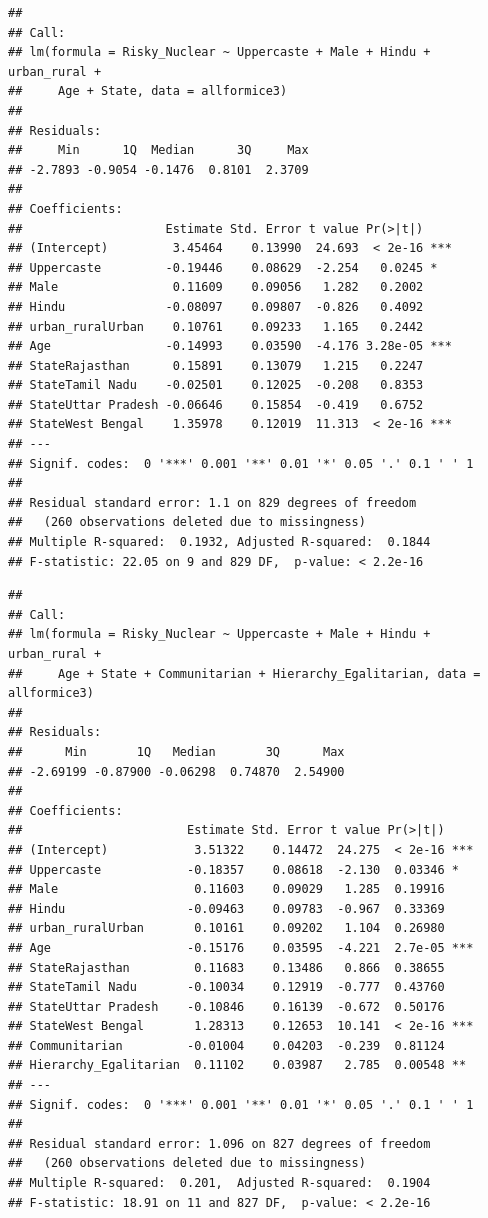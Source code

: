 \documentclass[
]{article}
\begin{document}
\begin{verbatim}
## 
## Call:
## lm(formula = Risky_Nuclear ~ Uppercaste + Male + Hindu + urban_rural + 
##     Age + State, data = allformice3)
## 
## Residuals:
##     Min      1Q  Median      3Q     Max 
## -2.7893 -0.9054 -0.1476  0.8101  2.3709 
## 
## Coefficients:
##                    Estimate Std. Error t value Pr(>|t|)    
## (Intercept)         3.45464    0.13990  24.693  < 2e-16 ***
## Uppercaste         -0.19446    0.08629  -2.254   0.0245 *  
## Male                0.11609    0.09056   1.282   0.2002    
## Hindu              -0.08097    0.09807  -0.826   0.4092    
## urban_ruralUrban    0.10761    0.09233   1.165   0.2442    
## Age                -0.14993    0.03590  -4.176 3.28e-05 ***
## StateRajasthan      0.15891    0.13079   1.215   0.2247    
## StateTamil Nadu    -0.02501    0.12025  -0.208   0.8353    
## StateUttar Pradesh -0.06646    0.15854  -0.419   0.6752    
## StateWest Bengal    1.35978    0.12019  11.313  < 2e-16 ***
## ---
## Signif. codes:  0 '***' 0.001 '**' 0.01 '*' 0.05 '.' 0.1 ' ' 1
## 
## Residual standard error: 1.1 on 829 degrees of freedom
##   (260 observations deleted due to missingness)
## Multiple R-squared:  0.1932, Adjusted R-squared:  0.1844 
## F-statistic: 22.05 on 9 and 829 DF,  p-value: < 2.2e-16
\end{verbatim}

\begin{verbatim}
## 
## Call:
## lm(formula = Risky_Nuclear ~ Uppercaste + Male + Hindu + urban_rural + 
##     Age + State + Communitarian + Hierarchy_Egalitarian, data = allformice3)
## 
## Residuals:
##      Min       1Q   Median       3Q      Max 
## -2.69199 -0.87900 -0.06298  0.74870  2.54900 
## 
## Coefficients:
##                       Estimate Std. Error t value Pr(>|t|)    
## (Intercept)            3.51322    0.14472  24.275  < 2e-16 ***
## Uppercaste            -0.18357    0.08618  -2.130  0.03346 *  
## Male                   0.11603    0.09029   1.285  0.19916    
## Hindu                 -0.09463    0.09783  -0.967  0.33369    
## urban_ruralUrban       0.10161    0.09202   1.104  0.26980    
## Age                   -0.15176    0.03595  -4.221  2.7e-05 ***
## StateRajasthan         0.11683    0.13486   0.866  0.38655    
## StateTamil Nadu       -0.10034    0.12919  -0.777  0.43760    
## StateUttar Pradesh    -0.10846    0.16139  -0.672  0.50176    
## StateWest Bengal       1.28313    0.12653  10.141  < 2e-16 ***
## Communitarian         -0.01004    0.04203  -0.239  0.81124    
## Hierarchy_Egalitarian  0.11102    0.03987   2.785  0.00548 ** 
## ---
## Signif. codes:  0 '***' 0.001 '**' 0.01 '*' 0.05 '.' 0.1 ' ' 1
## 
## Residual standard error: 1.096 on 827 degrees of freedom
##   (260 observations deleted due to missingness)
## Multiple R-squared:  0.201,  Adjusted R-squared:  0.1904 
## F-statistic: 18.91 on 11 and 827 DF,  p-value: < 2.2e-16
\end{verbatim}
\end{document}
